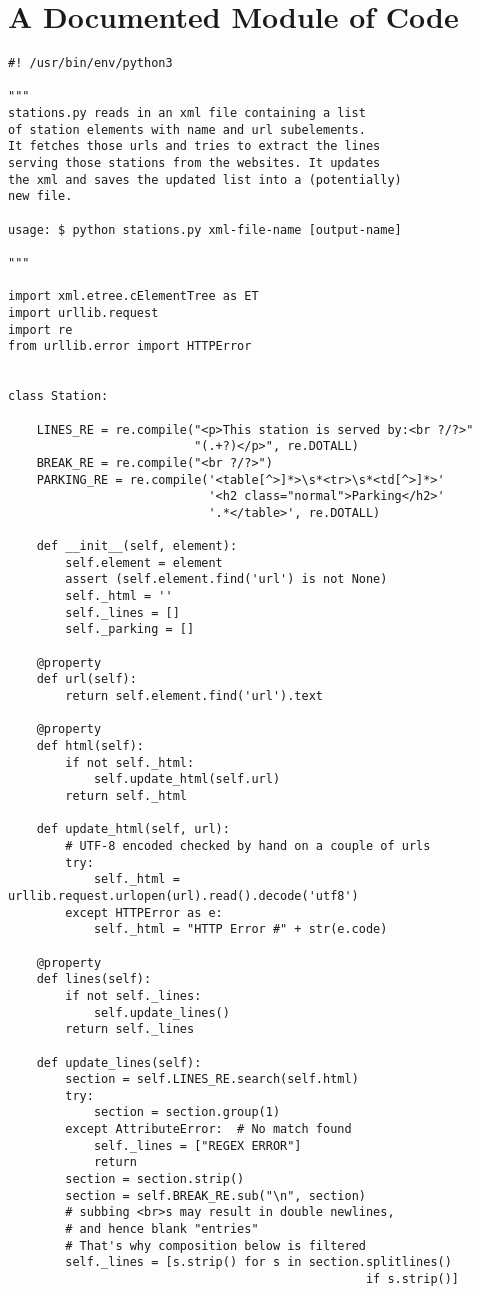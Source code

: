 \documentclass[12pt]{article}
\begin{document}
\section{A Documented Module of Code}
\fontsize{10}{12}\selectfont
\begin{verbatim}
#! /usr/bin/env/python3

"""
stations.py reads in an xml file containing a list
of station elements with name and url subelements.
It fetches those urls and tries to extract the lines
serving those stations from the websites. It updates
the xml and saves the updated list into a (potentially)
new file.

usage: $ python stations.py xml-file-name [output-name]

"""

import xml.etree.cElementTree as ET
import urllib.request
import re
from urllib.error import HTTPError


class Station:

    LINES_RE = re.compile("<p>This station is served by:<br ?/?>"
                          "(.+?)</p>", re.DOTALL)
    BREAK_RE = re.compile("<br ?/?>")
    PARKING_RE = re.compile('<table[^>]*>\s*<tr>\s*<td[^>]*>'
                            '<h2 class="normal">Parking</h2>'
                            '.*</table>', re.DOTALL)

    def __init__(self, element):
        self.element = element
        assert (self.element.find('url') is not None)
        self._html = ''
        self._lines = []
        self._parking = []

    @property
    def url(self):
        return self.element.find('url').text

    @property
    def html(self):
        if not self._html:
            self.update_html(self.url)
        return self._html

    def update_html(self, url):
        # UTF-8 encoded checked by hand on a couple of urls
        try:
            self._html = urllib.request.urlopen(url).read().decode('utf8')
        except HTTPError as e:
            self._html = "HTTP Error #" + str(e.code)

    @property
    def lines(self):
        if not self._lines:
            self.update_lines()
        return self._lines

    def update_lines(self):
        section = self.LINES_RE.search(self.html)
        try:
            section = section.group(1)
        except AttributeError:  # No match found
            self._lines = ["REGEX ERROR"]
            return
        section = section.strip()
        section = self.BREAK_RE.sub("\n", section)
        # subbing <br>s may result in double newlines,
        # and hence blank "entries"
        # That's why composition below is filtered
        self._lines = [s.strip() for s in section.splitlines()
                                                  if s.strip()]


\end{verbatim}
\end{document}

